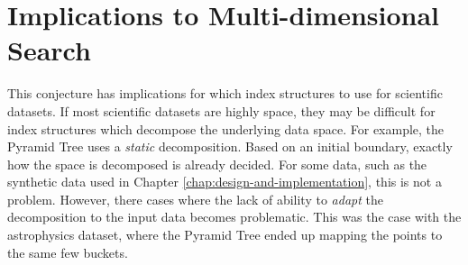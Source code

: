 \section{Implications to Multi-dimensional Search}

This conjecture has implications for which index structures to use for scientific datasets. If most scientific datasets are highly space, they may be difficult for index structures which decompose the underlying data space. For example, the Pyramid Tree uses a \textit{static} decomposition. Based on an initial boundary, exactly how the space is decomposed is already decided. For some data, such as the synthetic data used in Chapter \ref{chap:design-and-implementation}, this is not a problem. However, there cases where the lack of ability to \textit{adapt} the decomposition to the input data becomes problematic. This was the case with the astrophysics dataset, where the Pyramid Tree ended up mapping the points to the same few buckets.

